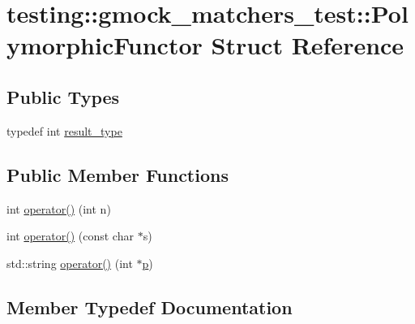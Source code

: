 \hypertarget{structtesting_1_1gmock__matchers__test_1_1_polymorphic_functor}{}\section{testing\+::gmock\+\_\+matchers\+\_\+test\+::Polymorphic\+Functor Struct Reference}
\label{structtesting_1_1gmock__matchers__test_1_1_polymorphic_functor}
\subsection*{Public Types}
\begin{DoxyCompactItemize}
\item 
typedef int \mbox{\hyperlink{structtesting_1_1gmock__matchers__test_1_1_polymorphic_functor_ae2b921ecae158b5eaa11a29ac6fe0cf3}{result\+\_\+type}}
\end{DoxyCompactItemize}
\subsection*{Public Member Functions}
\begin{DoxyCompactItemize}
\item 
int \mbox{\hyperlink{structtesting_1_1gmock__matchers__test_1_1_polymorphic_functor_a2fb8b012acd2ccd52788231036877c98}{operator()}} (int n)
\item 
int \mbox{\hyperlink{structtesting_1_1gmock__matchers__test_1_1_polymorphic_functor_aee4d200c7f85ce4d8048d1798a511002}{operator()}} (const char $\ast$s)
\item 
std\+::string \mbox{\hyperlink{structtesting_1_1gmock__matchers__test_1_1_polymorphic_functor_afadd033a9ae644f159fff6c14a247a70}{operator()}} (int $\ast$\mbox{\hyperlink{_obj__test_2lib_2googletest-master_2googlemock_2test_2gmock-matchers__test_8cc_a6bc6b007533335efe02bafff799ec64c}{p}})
\end{DoxyCompactItemize}


\subsection{Member Typedef Documentation}
\mbox{\label{structtesting_1_1gmock__matchers__test_1_1_polymorphic_functor_ae2b921ecae158b5eaa11a29ac6fe0cf3}} 
